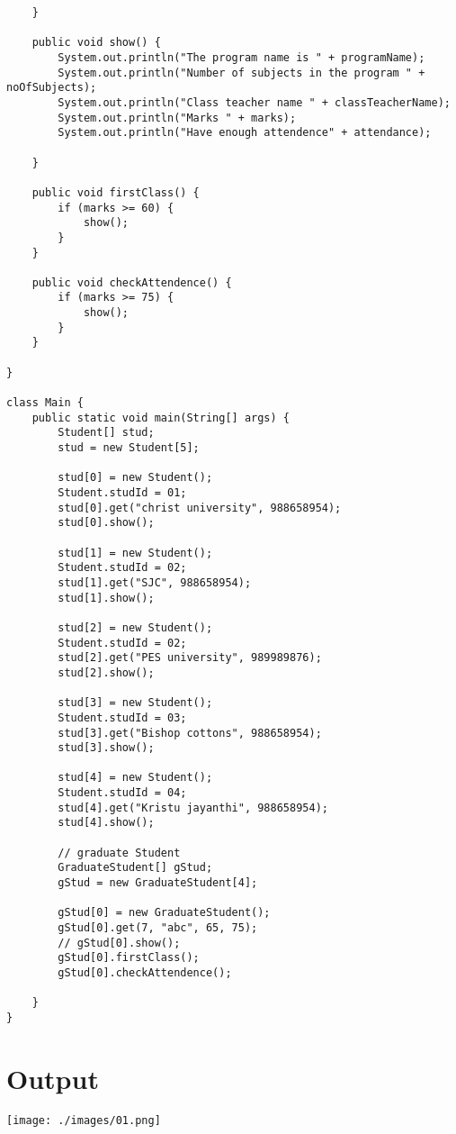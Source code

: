 \documentclass{article}
\begin{document}
\begin{lstlisting}
    }

    public void show() {
        System.out.println("The program name is " + programName);
        System.out.println("Number of subjects in the program " + noOfSubjects);
        System.out.println("Class teacher name " + classTeacherName);
        System.out.println("Marks " + marks);
        System.out.println("Have enough attendence" + attendance);

    }

    public void firstClass() {
        if (marks >= 60) {
            show();
        }
    }

    public void checkAttendence() {
        if (marks >= 75) {
            show();
        }
    }

}

class Main {
    public static void main(String[] args) {
        Student[] stud;
        stud = new Student[5];

        stud[0] = new Student();
        Student.studId = 01;
        stud[0].get("christ university", 988658954);
        stud[0].show();

        stud[1] = new Student();
        Student.studId = 02;
        stud[1].get("SJC", 988658954);
        stud[1].show();

        stud[2] = new Student();
        Student.studId = 02;
        stud[2].get("PES university", 989989876);
        stud[2].show();

        stud[3] = new Student();
        Student.studId = 03;
        stud[3].get("Bishop cottons", 988658954);
        stud[3].show();

        stud[4] = new Student();
        Student.studId = 04;
        stud[4].get("Kristu jayanthi", 988658954);
        stud[4].show();

        // graduate Student
        GraduateStudent[] gStud;
        gStud = new GraduateStudent[4];

        gStud[0] = new GraduateStudent();
        gStud[0].get(7, "abc", 65, 75);
        // gStud[0].show();
        gStud[0].firstClass();
        gStud[0].checkAttendence();

    }
}
\end{lstlisting}

\section*{Output}
\texttt{[image: ./images/01.png]}
\end{document}
